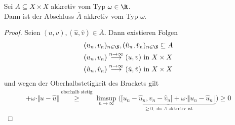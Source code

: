 \begin{lemma}
Sei $A\subseteq X\times X$ akkretiv vom Typ $\omega\in\R$.\\
Dann ist der Abschluss $\overline{A}$ akkretiv vom Typ $\omega$.
\end{lemma}
\begin{proof}
Seien $(u,v),(\hat{u},\hat{v})\in\overline{A}$. Dann existieren Folgen 
\begin{align*}
&(u_n,v_n)_{n\in\N},(\hat{u}_n,\hat{v}_n)_{n\in\N}\subseteq A\mit\\
&(u_n,v_n)
\stackrel{n\to\infty}{\longrightarrow}
(u,v)\text{ in } X\times X\\
&(\hat{u}_n,\hat{v}_n)
\stackrel{n\to\infty}{\longrightarrow}
(\hat{u},\hat{v})\text{ in } X\times X
\end{align*}
und wegen der Oberhalbstetigkeit des Brackets gilt
\begin{align*}
[u-\hat{u},v-\hat{v}]+\omega\cdot\Vert u-\hat{u}\Vert
\stackrel{\text{oberhalb stetig}}{\geq}
\limsup\limits_{n\to\infty}\Big(\underbrace{\big[ u_n-\hat{u}_n,v_n-\hat{v}_n\big]+\omega\cdot\Vert u_n-\hat{u}_n\Vert}_{\geq0,\text{ da $A$ akkretiv ist}}\Big)
\geq0
\end{align*}
\end{proof}

